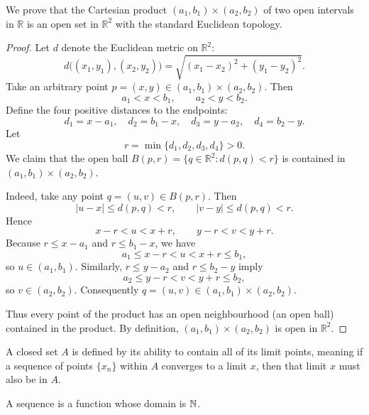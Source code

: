 \begin{example}
	We prove that the Cartesian product \((a_1,b_1)\times(a_2,b_2)\) of two open intervals in \(\mathbb{R}\) is an open set in \(\mathbb{R}^2\) with the standard Euclidean topology.

	\begin{proof}
		Let \(d\) denote the Euclidean metric on \(\mathbb{R}^2\):
		\[
			d\big((x_1,y_1),(x_2,y_2)\big)=\sqrt{(x_1-x_2)^2+(y_1-y_2)^2}.
		\]
		Take an arbitrary point \(p=(x,y)\in (a_1,b_1)\times(a_2,b_2)\). Then
		\[
			a_1 < x < b_1,\qquad a_2 < y < b_2.
		\]
		Define the four positive distances to the endpoints:
		\[
			d_1 = x - a_1,\quad d_2 = b_1 - x,\quad d_3 = y - a_2,\quad d_4 = b_2 - y.
		\]
		Let
		\[
			r = \min\{d_1,d_2,d_3,d_4\}>0.
		\]
		We claim that the open ball \(B(p,r)=\{q\in\mathbb{R}^2 : d(p,q)<r\}\) is contained in \((a_1,b_1)\times(a_2,b_2)\).

		Indeed, take any point \(q=(u,v)\in B(p,r)\). Then
		\[
			|u-x|\le d(p,q)<r,\qquad |v-y|\le d(p,q)<r.
		\]
		Hence
		\[
			x-r < u < x+r,\qquad y-r < v < y+r.
		\]
		Because \(r\le x-a_1\) and \(r\le b_1-x\), we have
		\[
			a_1 \le x-r < u < x+r \le b_1,
		\]
		so \(u\in(a_1,b_1)\). Similarly, \(r\le y-a_2\) and \(r\le b_2-y\) imply
		\[
			a_2 \le y-r < v < y+r \le b_2,
		\]
		so \(v\in(a_2,b_2)\). Consequently \(q=(u,v)\in(a_1,b_1)\times(a_2,b_2)\).

		Thus every point of the product has an open neighbourhood (an open ball) contained in the product. By definition, \((a_1,b_1)\times(a_2,b_2)\) is open in \(\mathbb{R}^2\).
	\end{proof}
\end{example}

\begin{definition}
	A closed set $A$ is defined by its ability to contain all of its limit points, meaning if a sequence of points $\{x_n\}$ within $A$ converges to a limit $x$, then that limit $x$ must also be in $A$.
\end{definition}

\begin{definition}[Sequence]
	A sequence is a function whose domain is $\mathbb{N}$.
\end{definition}
